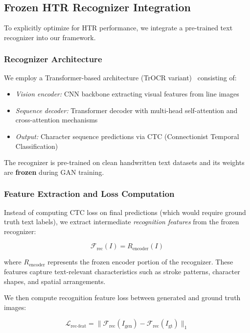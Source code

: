 \documentclass[journal]{IEEEtran}
\begin{document}
\subsection{Frozen HTR Recognizer Integration}

To explicitly optimize for HTR performance, we integrate a pre-trained text recognizer into our framework.

\subsubsection{Recognizer Architecture}

We employ a Transformer-based architecture (TrOCR variant)~\cite{li2021trocr} consisting of:
\begin{itemize}
    \item \textit{Vision encoder:} CNN backbone extracting visual features from line images
    \item \textit{Sequence decoder:} Transformer decoder with multi-head self-attention and cross-attention mechanisms
    \item \textit{Output:} Character sequence predictions via CTC (Connectionist Temporal Classification)
\end{itemize}

The recognizer is pre-trained on clean handwritten text datasets and its weights are \textbf{frozen} during GAN training.

\subsubsection{Feature Extraction and Loss Computation}

Instead of computing CTC loss on final predictions (which would require ground truth text labels), we extract intermediate \textit{recognition features} from the frozen recognizer:

\begin{equation}
\mathcal{F}_{\text{rec}}(I) = R_{\text{encoder}}(I)
\end{equation}

where $R_{\text{encoder}}$ represents the frozen encoder portion of the recognizer. These features capture text-relevant characteristics such as stroke patterns, character shapes, and spatial arrangements.

We then compute recognition feature loss between generated and ground truth images:

\begin{equation}
\mathcal{L}_{\text{rec-feat}} = \|\mathcal{F}_{\text{rec}}(I_{\text{gen}}) - \mathcal{F}_{\text{rec}}(I_{\text{gt}})\|_1
\end{equation}
\end{document}
